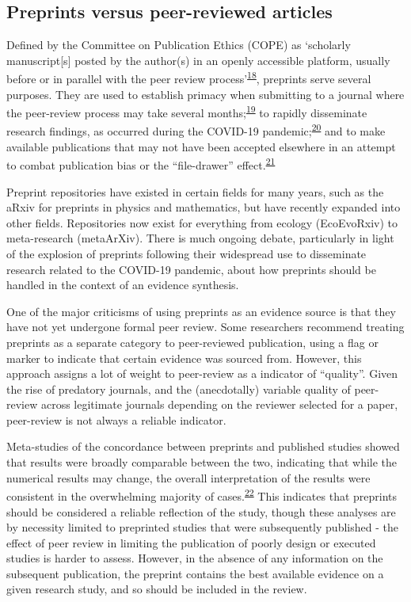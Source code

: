 \documentclass[a4paper, twoside]{templates/ociamthesis}
\begin{document}
\hypertarget{diverse-sources-preprints}{%
\subsection{Preprints versus peer-reviewed articles}\label{diverse-sources-preprints}}

Defined by the Committee on Publication Ethics (COPE) as `scholarly manuscript{[}s{]} posted by the author(s) in an openly accessible platform, usually before or in parallel with the peer review process'\textsuperscript{\protect\hyperlink{ref-committeeonpublicationethicscope2018}{18}}, preprints serve several purposes. They are used to establish primacy when submitting to a journal where the peer-review process may take several months;\textsuperscript{\protect\hyperlink{ref-vale2016}{19}} to rapidly disseminate research findings, as occurred during the COVID-19 pandemic;\textsuperscript{\protect\hyperlink{ref-fraser2020a}{20}} and to make available publications that may not have been accepted elsewhere in an attempt to combat publication bias or the ``file-drawer'' effect.\textsuperscript{\protect\hyperlink{ref-rosenthal1979}{21}}

Preprint repositories have existed in certain fields for many years, such as the aRxiv for preprints in physics and mathematics, but have recently expanded into other fields. Repositories now exist for everything from ecology (EcoEvoRxiv) to meta-research (metaArXiv). There is much ongoing debate, particularly in light of the explosion of preprints following their widespread use to disseminate research related to the COVID-19 pandemic, about how preprints should be handled in the context of an evidence synthesis.





One of the major criticisms of using preprints as an evidence source is that they have not yet undergone formal peer review. Some researchers recommend treating preprints as a separate category to peer-reviewed publication, using a flag or marker to indicate that certain evidence was sourced from. However, this approach assigns a lot of weight to peer-review as a indicator of ``quality''. Given the rise of predatory journals, and the (anecdotally) variable quality of peer-review across legitimate journals depending on the reviewer selected for a paper, peer-review is not always a reliable indicator.

Meta-studies of the concordance between preprints and published studies showed that results were broadly comparable between the two, indicating that while the numerical results may change, the overall interpretation of the results were consistent in the overwhelming majority of cases.\textsuperscript{\protect\hyperlink{ref-shi2021a}{22}} This indicates that preprints should be considered a reliable reflection of the study, though these analyses are by necessity limited to preprinted studies that were subsequently published - the effect of peer review in limiting the publication of poorly design or executed studies is harder to assess. However, in the absence of any information on the subsequent publication, the preprint contains the best available evidence on a given research study, and so should be included in the review.
\end{document}
